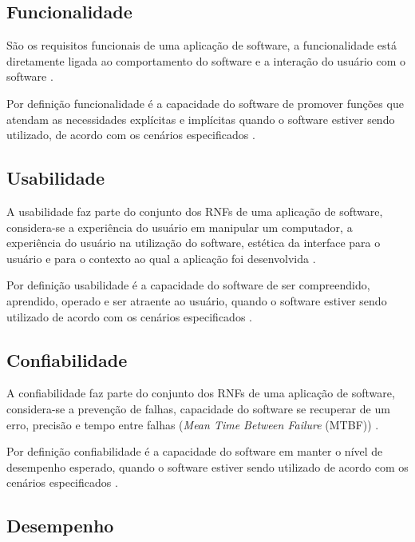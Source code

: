 \subsection{Funcionalidade}
\label{subsec:funcionalidade}

São os requisitos funcionais de uma aplicação de software, a funcionalidade está diretamente ligada ao comportamento do software e a interação do usuário com o software \cite{cintra2006implementaccao}.

Por definição funcionalidade é a capacidade do software de promover funções que atendam as necessidades explícitas e implícitas quando o software estiver sendo utilizado, de acordo com os cenários especificados \cite{qualidadeDeProdutoNBR}.

\subsection{Usabilidade}
\label{subsec:usabilidade}

A usabilidade faz parte do conjunto dos RNFs de uma aplicação de software, considera-se a experiência do usuário em manipular um computador, a experiência do usuário na utilização do software, estética da interface para o usuário e para o contexto ao qual a aplicação foi desenvolvida \cite{cintra2006implementaccao}.

Por definição usabilidade é a capacidade do software de ser compreendido, aprendido, operado e ser atraente ao usuário, quando o software estiver sendo utilizado de acordo com os cenários especificados \cite{qualidadeDeProdutoNBR}.


\subsection{Confiabilidade}
\label{subsec:confiabilidade}

A confiabilidade faz parte do conjunto dos RNFs de uma aplicação de software, considera-se a prevenção de falhas, capacidade do software se recuperar de um erro, precisão e tempo entre falhas (\textit{Mean Time Between Failure} (MTBF)) \cite{cintra2006implementaccao}.

Por definição confiabilidade é a capacidade do software em manter o nível de desempenho esperado, quando o software estiver sendo utilizado de acordo com os cenários especificados \cite{qualidadeDeProdutoNBR}.  

\subsection{Desempenho}
\label{subsec:desempenho}

